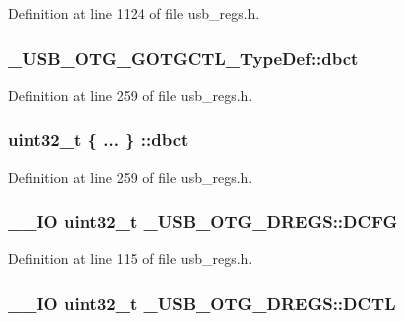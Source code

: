 Definition at line 1124 of file usb\-\_\-regs.\-h.

\hypertarget{group___u_s_b___o_t_g___d_r_i_v_e_r_gab4cc914b75de1112a34a92d317e116e2}{
\subsubsection[{dbct}]{ \-\_\-\-U\-S\-B\-\_\-\-O\-T\-G\-\_\-\-G\-O\-T\-G\-C\-T\-L\-\_\-\-Type\-Def\-::dbct}}\label{group___u_s_b___o_t_g___d_r_i_v_e_r_gab4cc914b75de1112a34a92d317e116e2}


Definition at line 259 of file usb\-\_\-regs.\-h.

\hypertarget{group___u_s_b___o_t_g___d_r_i_v_e_r_ga9e40f97fe0c28d16cad0592030cd67cf}{
\subsubsection[{dbct}]{\setlength{\rightskip}{0pt plus 5cm}uint32\-\_\-t \{ ... \} \-::dbct}}\label{group___u_s_b___o_t_g___d_r_i_v_e_r_ga9e40f97fe0c28d16cad0592030cd67cf}


Definition at line 259 of file usb\-\_\-regs.\-h.

\hypertarget{group___u_s_b___o_t_g___d_r_i_v_e_r_ga330a64c75ae5e724ad919d92fb338100}{
\subsubsection[{D\-C\-F\-G}]{\setlength{\rightskip}{0pt plus 5cm}\-\_\-\-\_\-\-I\-O {\bf uint32\-\_\-t} \-\_\-\-U\-S\-B\-\_\-\-O\-T\-G\-\_\-\-D\-R\-E\-G\-S\-::\-D\-C\-F\-G}}\label{group___u_s_b___o_t_g___d_r_i_v_e_r_ga330a64c75ae5e724ad919d92fb338100}


Definition at line 115 of file usb\-\_\-regs.\-h.

\hypertarget{group___u_s_b___o_t_g___d_r_i_v_e_r_ga03802e91c803d405c5c638bac352843d}{
\subsubsection[{D\-C\-T\-L}]{\setlength{\rightskip}{0pt plus 5cm}\-\_\-\-\_\-\-I\-O {\bf uint32\-\_\-t} \-\_\-\-U\-S\-B\-\_\-\-O\-T\-G\-\_\-\-D\-R\-E\-G\-S\-::\-D\-C\-T\-L}}\label{group___u_s_b___o_t_g___d_r_i_v_e_r_ga03802e91c803d405c5c638bac352843d}


